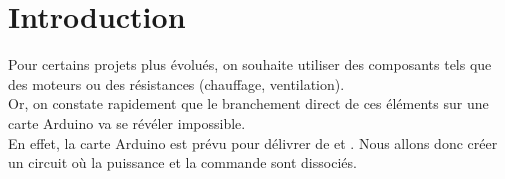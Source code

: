 \chapter{Introduction}

Pour certains projets plus évolués, on souhaite utiliser des composants tels que des moteurs ou des résistances (chauffage, ventilation).\\

Or, on constate rapidement que le branchement direct de ces éléments sur une carte Arduino va se révéler impossible. \\

En effet, la carte Arduino est prévu pour délivrer de  et . Nous allons donc créer un circuit où la puissance et la commande sont dissociés.
